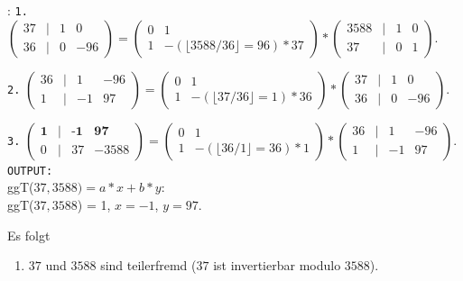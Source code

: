 \begin{refsegment}
\begin{example}{:}
{\tt 1.}
 $ \left(\begin{array}{cccc} 37 & | & 1 & 0 \\ 36 & | & 0 & -96 \end{array} \right) =
   \left(\begin{array}{cc} 0 & 1  \\ 1 & - (\lfloor 3588/36 \rfloor = 96) * 37 \end{array} \right)*
   \left(\begin{array}{cccc} 3588 & | & 1 & 0 \\ 37 & | & 0 & 1 \end{array} \right).$

{\tt 2.}
 $ \left(\begin{array}{cccc} 36 & | & 1 & -96 \\ 1 & | & -1 & 97 \end{array} \right) =
   \left(\begin{array}{cc} 0 & 1  \\ 1 & - (\lfloor 37/36 \rfloor = 1) * 36 \end{array} \right)*
   \left(\begin{array}{cccc} 37 & | & 1 & 0 \\ 36 & | & 0 & -96 \end{array} \right).$

{\tt 3.}
 $ \left(\begin{array}{cccc} \textbf{1} & | & \textbf{-1} & \textbf{97} \\ 0 & | & 37 & -3588 \end{array} \right) =
   \left(\begin{array}{cc} 0 & 1  \\ 1 & - (\lfloor 36/1 \rfloor = 36) * 1 \end{array} \right)*
   \left(\begin{array}{cccc} 36 & | & 1 & -96 \\ 1 & | & -1 & 97 \end{array} \right).$\\

 {\tt OUTPUT:}\\
ggT($37,3588) = a*x + b*y$:\\
ggT($37,3588$) = 1, $x = -1$, $y=97$.

 Es folgt
\begin{enumerate}

   \item $37$ und $3588$ sind teilerfremd
         ($37$ ist invertierbar modulo $3588$).


\end{enumerate}
\end{example}
\end{refsegment}
